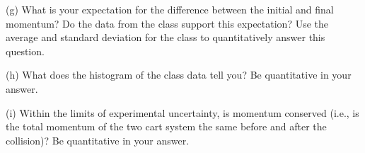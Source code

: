 (g) What is your expectation for the difference between the initial and final momentum? 
Do the data from the class support this expectation?  
Use the average and standard deviation for the class to quantitatively answer this question.
\vspace{20mm}

(h) What does the histogram of the class data tell you? Be quantitative in your answer.
\vspace{20mm}

(i) Within the limits of experimental uncertainty, is momentum 
conserved (i.e., is the total momentum of the two cart system the same before
and after the collision)?  Be quantitative in your answer.
\vspace{20mm}

